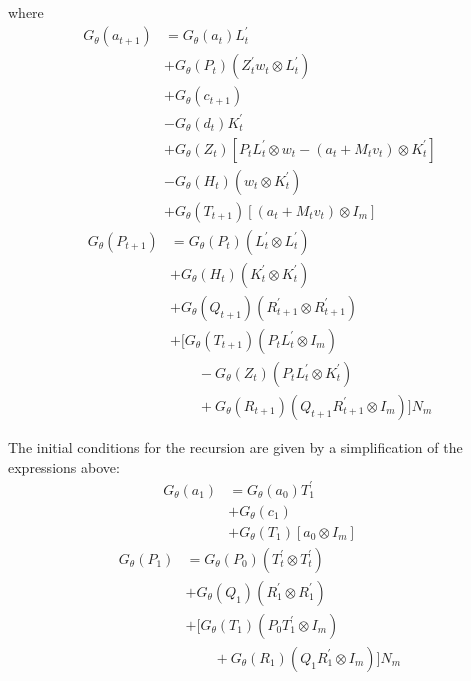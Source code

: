 \documentclass[12pt]{article}
\newcommand{\Gt}{G_\theta}
\begin{document}
where 
\begin{align*}
\Gt(a_{t+1}) &= \Gt(a_t)L_t^\prime \\ 	
 &+ \Gt(P_t) (Z_t^\prime w_t \otimes L_t^\prime) \\
 &+ \Gt(c_{t+1}) \\
 &- \Gt(d_t) K_t^\prime \\ 
 &+ \Gt(Z_t) [P_tL_t^\prime \otimes w_t - (a_t + M_t v_t) \otimes K_t^\prime] \\
 &- \Gt(H_t) (w_t \otimes K_t^\prime) \\ 
 &+ \Gt(T_{t+1})[(a_t + M_t v_t) \otimes I_m]
\end{align*}
\begin{align*}
\Gt(P_{t+1}) &= \Gt(P_t) (L_t^\prime \otimes L_t^\prime) \\
 &+ \Gt(H_t)(K_t^\prime \otimes K_t^\prime) \\
 &+ \Gt(Q_{t+1})(R_{t+1}^\prime \otimes R_{t+1}^\prime) \\
 &+ [\Gt(T_{t+1})(P_t L_t^\prime \otimes I_m) \\
 &\qquad - \Gt(Z_t)(P_t L_t^\prime \otimes K_t^\prime) \\
 &\qquad + \Gt(R_{t+1})(Q_{t+1}R_{t+1}^\prime \otimes I_m) ] N_m
\end{align*}


The initial conditions for the recursion are given by a simplification of the expressions above: 
\begin{align*}
\Gt(a_1) &= \Gt(a_0) T_1^\prime \\ 
 &+ \Gt(c_1)  \\
 &+ \Gt(T_1)[a_0 \otimes I_m]
\end{align*}
\begin{align*}
\Gt(P_1) &= \Gt(P_0) (T_t^\prime \otimes T_t^\prime) \\
 &+ \Gt(Q_1)(R_1^\prime \otimes R_1^\prime) \\
 &+ [\Gt(T_1)(P_0 T_1^\prime \otimes I_m) \\
 &\qquad + \Gt(R_1)(Q_1 R_1^\prime \otimes I_m) ] N_m
\end{align*}
\end{document}
